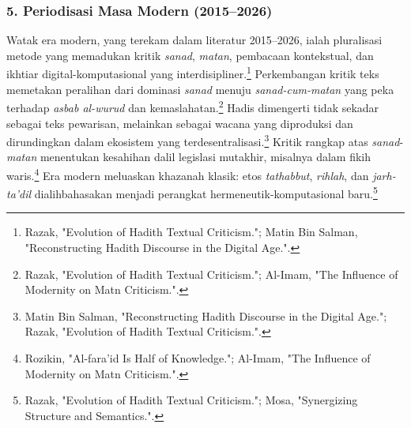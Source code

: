 \subsubsection*{5. Periodisasi Masa Modern (2015--2026)}

Watak era modern, yang terekam dalam literatur 2015--2026, ialah pluralisasi metode yang memadukan kritik \textit{sanad}, \textit{matan}, pembacaan kontekstual, dan ikhtiar digital-komputasional yang interdisipliner.\footnote{Razak, "Evolution of Hadith Textual Criticism."; Matin Bin Salman, "Reconstructing Hadith Discourse in the Digital Age.".} Perkembangan kritik teks memetakan peralihan dari dominasi \textit{sanad} menuju \textit{sanad-cum-matan} yang peka terhadap \textit{asbab al-wurud} dan kemaslahatan.\footnote{Razak, "Evolution of Hadith Textual Criticism."; Al-Imam, "The Influence of Modernity on Matn Criticism.".} Hadis dimengerti tidak sekadar sebagai teks pewarisan, melainkan sebagai wacana yang diproduksi dan dirundingkan dalam ekosistem yang terdesentralisasi.\footnote{Matin Bin Salman, "Reconstructing Hadith Discourse in the Digital Age."; Razak, "Evolution of Hadith Textual Criticism.".} Kritik rangkap atas \textit{sanad}-\textit{matan} menentukan kesahihan dalil legislasi mutakhir, misalnya dalam fikih waris.\footnote{Rozikin, "Al-fara'id Is Half of Knowledge."; Al-Imam, "The Influence of Modernity on Matn Criticism.".} Era modern meluaskan khazanah klasik: etos \textit{tathabbut}, \textit{rihlah}, dan \textit{jarh-ta'dil} dialihbahasakan menjadi perangkat hermeneutik-komputasional baru.\footnote{Razak, "Evolution of Hadith Textual Criticism."; Mosa, "Synergizing Structure and Semantics.".}

